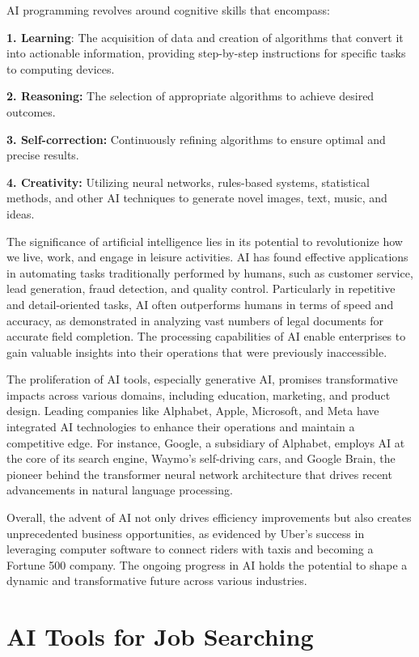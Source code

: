 \documentclass[
]{book}
\begin{document}
AI programming revolves around cognitive skills that encompass:

\textbf{1. Learning}: The acquisition of data and creation of algorithms that convert it into actionable information, providing step-by-step instructions for specific tasks to computing devices.

\textbf{2. Reasoning:} The selection of appropriate algorithms to achieve desired outcomes.

\textbf{3. Self-correction:} Continuously refining algorithms to ensure optimal and precise results.

\textbf{4. Creativity:} Utilizing neural networks, rules-based systems, statistical methods, and other AI techniques to generate novel images, text, music, and ideas.

The significance of artificial intelligence lies in its potential to revolutionize how we live, work, and engage in leisure activities. AI has found effective applications in automating tasks traditionally performed by humans, such as customer service, lead generation, fraud detection, and quality control. Particularly in repetitive and detail-oriented tasks, AI often outperforms humans in terms of speed and accuracy, as demonstrated in analyzing vast numbers of legal documents for accurate field completion. The processing capabilities of AI enable enterprises to gain valuable insights into their operations that were previously inaccessible.

The proliferation of AI tools, especially generative AI, promises transformative impacts across various domains, including education, marketing, and product design. Leading companies like Alphabet, Apple, Microsoft, and Meta have integrated AI technologies to enhance their operations and maintain a competitive edge. For instance, Google, a subsidiary of Alphabet, employs AI at the core of its search engine, Waymo's self-driving cars, and Google Brain, the pioneer behind the transformer neural network architecture that drives recent advancements in natural language processing.

Overall, the advent of AI not only drives efficiency improvements but also creates unprecedented business opportunities, as evidenced by Uber's success in leveraging computer software to connect riders with taxis and becoming a Fortune 500 company. The ongoing progress in AI holds the potential to shape a dynamic and transformative future across various industries.

\hypertarget{ai-tools-for-job-searching}{%
\chapter{AI Tools for Job Searching}\label{ai-tools-for-job-searching}}
\end{document}
